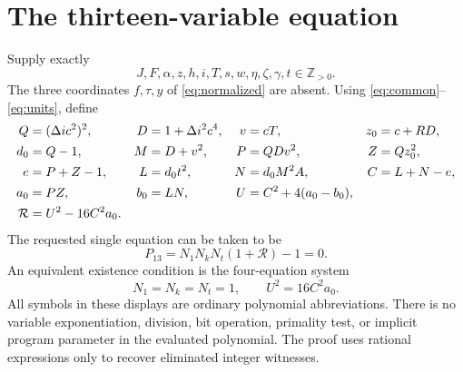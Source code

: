 \documentclass[11pt,a4paper]{article}
\theoremstyle{remark}\newtheorem{remark}[theorem]{Remark}
\newcommand{\Pos}{\mathbb Z_{>0}}
\begin{document}
\section{The thirteen-variable equation}
\label{sec:thirteen}

Supply exactly
\[
 \boxed{\quad J,F,\alpha,z,h,i,T,s,w,\eta,\zeta,\gamma,t\in\Pos.\quad}
\]
The three coordinates $f,\tau,y$ of \eqref{eq:normalized} are absent.
Using \eqref{eq:common}--\eqref{eq:units}, define
\begin{align}
 Q&=(\Delta i c^2)^2,&D&=1+\Delta i^2c^4,&v&=cT,&z_0&=c+RD,\notag\\
 d_0&=Q-1,&M&=D+v^2,&P&=QDv^2,&Z&=Qz_0^2,\notag\\
 e&=P+Z-1,&L&=d_0t^2,&N&=d_0M^2A,&C&=L+N-e,\notag\\
 a_0&=PZ,&b_0&=LN,&U&=C^2+4(a_0-b_0),\notag\\
 \mathcal R&=U^2-16C^2a_0.\label{eq:13defs}
\end{align}
The requested single equation can be taken to be
\begin{equation}
 \boxed{\quad P_{13}=N_1N_kN_t(1+\mathcal R)-1=0.\quad}
 \label{eq:P13}
\end{equation}
An equivalent existence condition is the four-equation system
\begin{equation}
 \boxed{\quad N_1=N_k=N_t=1,\qquad U^2=16C^2a_0.\quad}
 \label{eq:S13}
\end{equation}
All symbols in these displays are ordinary polynomial abbreviations.
There is no variable exponentiation, division, bit operation, primality
test, or implicit program parameter in the evaluated polynomial.
The proof uses rational expressions only to recover eliminated integer
witnesses.
\end{document}
